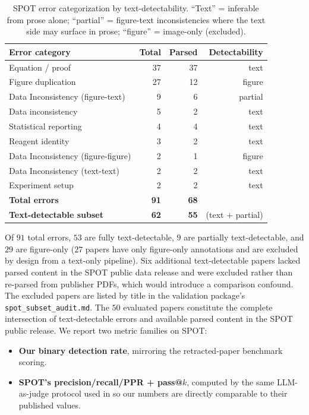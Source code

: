 \documentclass[11pt]{article}
\theoremstyle{definition}
\begin{document}
\begin{table}[ht]
\centering
\caption{SPOT error categorization by text-detectability. ``Text'' = inferable from prose alone; ``partial'' = figure-text inconsistencies where the text side may surface in prose; ``figure'' = image-only (excluded).}
\label{tab:spot_subset}
\small
\begin{tabular}{lrrr}
\toprule
\textbf{Error category} & \textbf{Total} & \textbf{Parsed} & \textbf{Detectability} \\
\midrule
Equation / proof                   & 37 & 37 & text \\
Figure duplication                 & 27 & 12 & figure \\
Data Inconsistency (figure-text)   &  9 &  6 & partial \\
Data inconsistency                 &  5 &  2 & text \\
Statistical reporting              &  4 &  4 & text \\
Reagent identity                   &  3 &  2 & text \\
Data Inconsistency (figure-figure) &  2 &  1 & figure \\
Data Inconsistency (text-text)     &  2 &  2 & text \\
Experiment setup                   &  2 &  2 & text \\
\midrule
\textbf{Total errors}              & \textbf{91} & \textbf{68} & \\
\textbf{Text-detectable subset}    & \textbf{62} & \textbf{55} & (text + partial) \\
\bottomrule
\end{tabular}
\end{table}

Of $91$ total errors, $53$ are fully text-detectable, $9$ are partially text-detectable, and $29$ are figure-only ($27$ papers have only figure-only annotations and are excluded by design from a text-only pipeline). Six additional text-detectable papers lacked parsed content in the SPOT public data release and were excluded rather than re-parsed from publisher PDFs, which would introduce a comparison confound. The excluded papers are listed by title in the validation package's \texttt{spot\_subset\_audit.md}. The $50$ evaluated papers constitute the complete intersection of text-detectable errors and available parsed content in the SPOT public release. We report two metric families on SPOT:
\begin{itemize}[nosep]
\item \textbf{Our binary detection rate}, mirroring the retracted-paper benchmark scoring.
\item \textbf{SPOT's precision/recall/PPR + pass@$k$}, computed by the same LLM-as-judge protocol used in \citet{son2025spot} so our numbers are directly comparable to their published values.
\end{itemize}
\end{document}
